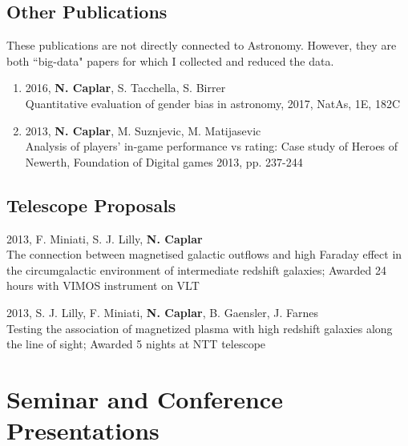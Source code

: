 \documentclass[11pt,letterpaper]{article}
\renewenvironment{itemize}{
  \begin{list}{}{
    \setlength{\leftmargin}{1.5em}
    \setlength{\itemsep}{0.15em}
    \setlength{\parskip}{0pt}
    \setlength{\parsep}{0.25em}
  }
}{
  \end{list}
}
\begin{document}
\newpage 
\subsection*{Other Publications}

These publications are not directly connected to Astronomy. However, they are both ``big-data" papers for which I collected and reduced the data.

\begin{enumerate}[resume]
\item 2016, \textbf{N. Caplar}, S. Tacchella, S. Birrer \\ Quantitative evaluation of gender bias in astronomy,  2017, NatAs, 1E, 182C

\item 2013,  \textbf{N. Caplar}, M. Suznjevic, M. Matijasevic  \\ Analysis of players' in-game performance vs rating: Case study of Heroes of Newerth, Foundation of Digital games 2013,  pp. 237-244
\end{enumerate}

\subsection*{Telescope Proposals}
\begin{itemize}
\item 2013, F. Miniati, S. J. Lilly, \textbf{N. Caplar} \\ The connection between magnetised galactic outflows and high Faraday effect in the circumgalactic environment of intermediate redshift galaxies;  Awarded 24 hours with VIMOS instrument on VLT
\item 2013, S. J. Lilly, F. Miniati,  \textbf{N. Caplar}, B. Gaensler, J. Farnes  \\ Testing the association of magnetized plasma with high redshift galaxies along the line of sight; 
Awarded 5 nights at NTT telescope
\end{itemize}

\section*{Seminar and Conference Presentations}
\end{document}
